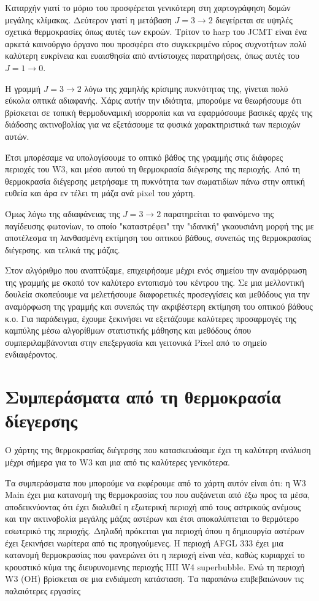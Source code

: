 \documentclass[a4paper,12pt]{memoir}
\begin{document}
Καταρχήν γιατί το μόριο του  προσφέρεται γενικότερη στη χαρτογράφηση δομών μεγάλης κλίμακας. Δεύτερον γιατί η μετάβαση $J=3\to 2$ διεγείρεται σε υψηλές σχετικά θερμοκρασίες όπως αυτές των εκροών. Τρίτον το harp του JCMT είναι ένα αρκετά καινούργιο όργανο που προσφέρει στο συγκεκριμένο εύρος συχνοτήτων πολύ καλύτερη ευκρίνεια και ευαισθησία από αντίστοιχες παρατηρήσεις, όπως αυτές του  $J=1\to 0$.

Η γραμμή  $J=3\to 2$ λόγω της χαμηλής κρίσιμης πυκνότητας της, γίνεται πολύ εύκολα οπτικά αδιαφανής. Χάρις αυτήν την ιδιότητα, μπορούμε να θεωρήσουμε ότι βρίσκεται σε τοπική θερμοδυναμική ισορροπία και να εφαρμόσουμε βασικές αρχές της διάδοσης ακτινοβολίας για να εξετάσουμε τα φυσικά χαρακτηριστικά των περιοχών αυτών. 

Έτσι μπορέσαμε να υπολογίσουμε το οπτικό βάθος της γραμμής στις διάφορες περιοχές του W3, και μέσο αυτού τη θερμοκρασία διέγερσης της περιοχής.
Από τη θερμοκρασία διέγερσης μετρήσαμε τη πυκνότητα των σωματιδίων πάνω στην οπτική ευθεία και άρα εν τέλει τη μάζα ανά pixel του χάρτη.

Όμως λόγω της αδιαφάνειας της  $J=3\to 2$ παρατηρείται το φαινόμενο της παγίδευσης φωτονίων, το οποίο "καταστρέφει" την "ιδανική" γκαουσιάνη μορφή της με αποτέλεσμα τη λανθασμένη εκτίμηση του οπτικού βάθους, συνεπώς της θερμοκρασίας διέγερσης. και τελικά της μάζας.

Στον αλγόριθμο που αναπτύξαμε, επιχειρήσαμε μέχρι ενός σημείου την αναμόρφωση της γραμμής  με σκοπό τον καλύτερο εντοπισμό του κέντρου της. Σε μια μελλοντική δουλεία σκοπεύουμε να μελετήσουμε διαφορετικές προσεγγίσεις και μεθόδους για την αναμόρφωση της γραμμής και συνεπώς την ακριβέστερη εκτίμηση του οπτικού βάθους κ.ο. Για παράδειγμα, έχουμε ξεκινήσει να εξετάζουμε καλύτερες προσαρμογές της καμπύλης μέσω αλγορίθμων στατιστικής μάθησης και μεθόδους όπου συμπεριλαμβάνονται στην επεξεργασία και γειτονικά Pixel από το σημείο ενδιαφέροντος.  

\section*{Συμπεράσματα από τη θερμοκρασία δίεγερσης}

Ο χάρτης της θερμοκρασίας διέγερσης που κατασκευάσαμε έχει τη καλύτερη ανάλυση μέχρι σήμερα για το W3 και μια από τις καλύτερες γενικότερα.

Τα συμπεράσματα που μπορούμε να εκφέρουμε από το χάρτη αυτόν είναι ότι: η W3 Main έχει μια κατανομή της θερμοκρασίας του που αυξάνεται από έξω προς τα μέσα, αποδεικνύοντας ότι έχει διαλυθεί η εξωτερική περιοχή από τους αστρικούς ανέμους και την ακτινοβολία μεγάλης μάζας αστέρων και έτσι αποκαλύπτεται το θερμότερο εσωτερικό της περιοχής. Δηλαδή πρόκειται για περιοχή όπου η δημιουργία αστέρων έχει ξεκινήσει νωρίτερα από τις προηγούμενες. Η περιοχή AFGL 333 έχει μια κατανομή θερμοκρασίας που φανερώνει ότι η περιοχή είναι νέα, καθώς κυριαρχεί το κρουστικό κύμα της διευρυνομενης περιοχής HII W4 superbubble. Ενώ τη περιοχή W3 (OH) βρίσκεται σε μια ενδιάμεση κατάσταση. 
Τα παραπάνω επιβεβαιώνουν τις παλαιότερες εργασίες \cite{polychroni_gas_2012,sakai_2005}
\end{document}
